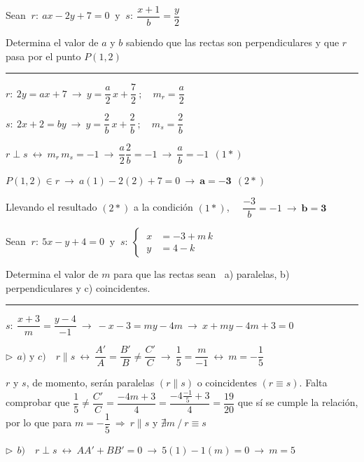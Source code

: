 \begin{miejercicio}

Sean $\ r:\ ax-2y+7=0 \ \text{ y } \ s:\ \dfrac{x+1}{b}=\dfrac{y}{2}$

\vspace{2mm} Determina el valor de $a$ y $b$ sabiendo que las rectas son perpendiculares y que $r$ pasa por el punto $P(1,2)$

\rule{250pt}{0.1pt}

\vspace{2mm} $r:\ 2y=ax+7 \ \to \ y=\dfrac a 2 \, x+ \dfrac 7 2 \ ; \quad m_r=\dfrac a 2$

\vspace{2mm} $s:\ 2x+2=by \ \to \ y=\dfrac 2 b \, x + \dfrac 2 b \ ; \quad m_s=\dfrac 2 b$

\vspace{2mm} $r\perp s \ \leftrightarrow \ m_r\, m_s=-1 \ \to \ \dfrac a 2 \dfrac 2 b =-1 \ \to \ \dfrac a b= -1\ \ (1*)$

\vspace{2mm} $P(1,2)\in r \ \to \ 	a(1)-2(2)+7=0 \ \to \ \boldsymbol{ a=-3} \ \ (2*)$

\vspace{2mm} Llevando el resultado $(2*)$ a la condición $(1*)$, $\quad \dfrac {-3} {b}=-1 \ \to \ \boldsymbol{b=3}$
\end{miejercicio}


\begin{miejercicio}

Sean $\ r:\ 5x-y+4=0\ \text{ y } \ s:\ \begin{cases} \ x&=-3+m\, k \\ \ y&=4-k \end{cases}$

\vspace{2mm} Determina el valor de $m$ para que las rectas sean $\ $ a) paralelas, b) perpendiculares y c) coincidentes.

\rule{250pt}{0.1pt}



\vspace{2mm} $s:\ \dfrac{x+3}{m}=\dfrac{y-4}{-1} \ \to \ -x-3=my-4m \ \to \ 
x+my-4m+3=0$


\vspace{4mm} $\triangleright \ \ a) \text{ y } c) \quad r\parallel s \ \leftrightarrow \ \dfrac{A'}{A}=\dfrac{B'}{B} \neq \dfrac{C'}{C} \ \to \ \dfrac{1}{5}=\dfrac{m}{-1} \ \leftrightarrow \ m=-\dfrac 1 5 $

\vspace{2mm} $r$ y $s$, de momento, serán paralelas $(r\parallel s)$ o coincidentes $(r\equiv s)$. Falta comprobar que $\dfrac 1 5 \neq \dfrac{C'}{C}=\dfrac{-4m+3}{4}=\dfrac{-4\frac {-1}{5} +3}{4}=\dfrac{19}{20}$ que sí se cumple la relación, por lo que para $m=-\dfrac 1 5  \ \Rightarrow \ r\parallel s$ y $\nexists m\ / \ r\equiv s$ 

\vspace{4mm} $\triangleright \ \ b) \quad r\perp s \ \leftrightarrow \ AA'+BB'=0 \ \to \ 5(1)-1(m)=0 \ \to \ m=5$


\end{miejercicio}



